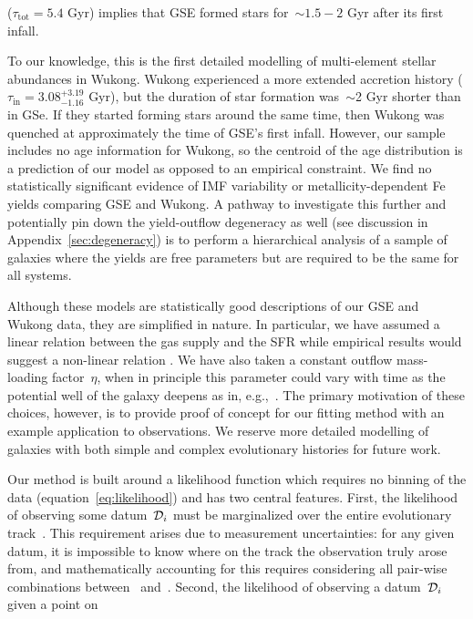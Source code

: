 \documentclass[ms.tex]{subfiles}
\begin{document}
($\tau_\text{tot} = 5.4$ Gyr) implies that GSE formed stars for~$\sim$$1.5 - 2$
Gyr after its first infall.
\par
To our knowledge, this is the first detailed modelling of multi-element stellar
abundances in Wukong.
Wukong experienced a more extended accretion history
($\tau_\text{in} = 3.08^{+3.19}_{-1.16}$ Gyr), but the duration of star
formation was~$\sim$2 Gyr shorter than in GSe.
If they started forming stars around the same time, then Wukong was quenched at
approximately the time of GSE's first infall.
However, our sample includes no age information for Wukong, so the centroid of
the age distribution is a prediction of our model as opposed to an empirical
constraint.
We find no statistically significant evidence of IMF variability or
metallicity-dependent Fe yields comparing GSE and Wukong.
A pathway to investigate this further and potentially pin down the
yield-outflow degeneracy as well (see discussion in
Appendix~\ref{sec:degeneracy}) is to perform a hierarchical analysis of a
sample of galaxies where the yields are free parameters but are required to be
the same for all systems.
\par
Although these models are statistically good descriptions of our GSE and Wukong
data, they are simplified in nature.
In particular, we have assumed a linear relation between the gas supply and the
SFR while empirical results would suggest a non-linear relation
\citep[e.g.,][]{Kennicutt1998, Kennicutt2012, delosReyes2019, Kennicutt2021}.
We have also taken a constant outflow mass-loading factor~$\eta$, when in
principle this parameter could vary with time as the potential well of the
galaxy deepens as in, e.g.,~\citet{Conroy2022}.
The primary motivation of these choices, however, is to provide proof of
concept for our fitting method with an example application to observations.
We reserve more detailed modelling of galaxies with both simple and complex
evolutionary histories for future work.
\par
Our method is built around a likelihood function which requires no binning of
the data (equation~\ref{eq:likelihood}) and has two central features.
First, the likelihood of observing some datum~$\script{D}_i$ must be
marginalized over the entire evolutionary track~.
This requirement arises due to measurement uncertainties: for any given datum,
it is impossible to know where on the track the observation truly arose from,
and mathematically accounting for this requires considering all pair-wise
combinations between~ and~.
Second, the likelihood of observing a datum~$\script{D}_i$ given a point on
$$
\end{document}
